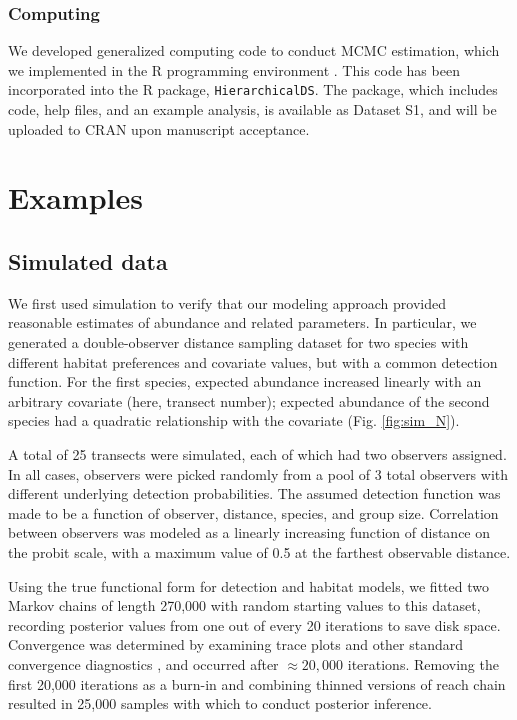 \documentclass[10pt]{article}
\begin{document}
\subsubsection*{Computing}

We developed generalized computing code to conduct MCMC estimation, which we implemented in the R programming environment \cite{RTeam2007}.  This code has been incorporated into the R package, {\tt HierarchicalDS}.  The package, which includes code, help files, and an example analysis, is available as Dataset S1, and will be uploaded to CRAN upon manuscript acceptance.


\section*{Examples}

\subsection*{Simulated data}

We first used simulation to verify that our modeling approach provided reasonable estimates of abundance and related parameters.  In particular, we generated a double-observer distance sampling dataset for two species with different habitat preferences and covariate values, but with a common detection function.  For the first species, expected abundance increased linearly with an arbitrary covariate (here, transect number); expected abundance of the second species had a quadratic relationship with the covariate (Fig. \ref{fig:sim_N}).

A total of 25 transects were simulated, each of which had two observers assigned.
In all cases, observers were picked randomly from a pool of 3 total observers with different underlying detection probabilities.  The assumed detection function was made to be a function of observer, distance, species, and group size.  Correlation between observers was modeled as a linearly increasing function of distance on the probit scale, with a maximum value of 0.5 at the farthest observable distance.  

Using the true functional form for detection and habitat models, we fitted two Markov chains of length 270,000 with random starting values to this dataset, recording posterior values from one out of every 20 iterations to save disk space.  Convergence was determined by examining trace plots and other standard convergence diagnostics \cite{GelmanEtAl2004}, and occurred after $\approx 20,000$ iterations. Removing the first 20,000 iterations as a burn-in and combining thinned versions of reach chain resulted in 25,000 samples with which to conduct posterior inference.
\end{document}
